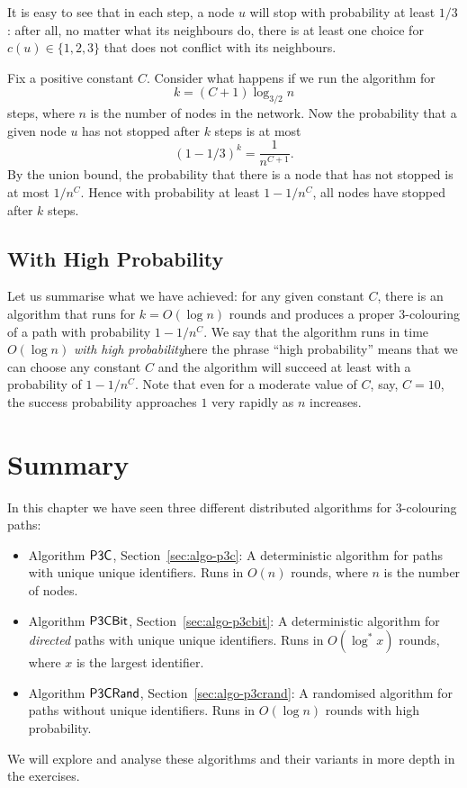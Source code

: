 It is easy to see that in each step, a node $u$ will stop with probability at least $1/3$: after all, no matter what its neighbours do, there is at least one choice for $c(u) \in \{1,2,3\}$ that does not conflict with its neighbours.

Fix a positive constant $C$. Consider what happens if we run the algorithm for
\[
    k = (C+1) \log_{3/2} n
\]
steps, where $n$ is the number of nodes in the network. Now the probability that a given node $u$ has not stopped after $k$ steps is at most
\[
    (1 - 1/3)^k = \frac{1}{n^{C+1}}.
\]
By the union bound, the probability that there is a node that has not stopped is at most $1/n^C$. Hence with probability at least $1-1/n^C$, all nodes have stopped after $k$ steps.


\subsection{With High Probability}

Let us summarise what we have achieved: for any given constant $C$, there is an algorithm that runs for $k = O(\log n)$ rounds and produces a proper $3$-colouring of a path with probability $1-1/n^C$. We say that the algorithm runs in time $O(\log n)$ \emph{with high probability}\mydash here the phrase ``high probability'' means that we can choose any constant $C$ and the algorithm will succeed at least with a probability of $1-1/n^C$. Note that even for a moderate value of $C$, say, $C = 10$, the success probability approaches $1$ very rapidly as $n$ increases.


\section{Summary}

In this chapter we have seen three different distributed algorithms for $3$-colouring paths:
\begin{itemize}
    \item Algorithm $\textup{\sffamily P3C}$, Section~\ref{sec:algo-p3c}: A deterministic algorithm for paths with unique unique identifiers. Runs in $O(n)$ rounds, where $n$ is the number of nodes.
    \item Algorithm $\textup{\sffamily P3CBit}$, Section~\ref{sec:algo-p3cbit}: A deterministic algorithm for \emph{directed} paths with unique unique identifiers. Runs in $O(\log^* x)$ rounds, where $x$ is the largest identifier.
    \item Algorithm $\textup{\sffamily P3CRand}$, Section~\ref{sec:algo-p3crand}: A randomised algorithm for paths without unique identifiers. Runs in $O(\log n)$ rounds with high probability.
\end{itemize}
We will explore and analyse these algorithms and their variants in more depth in the exercises.


